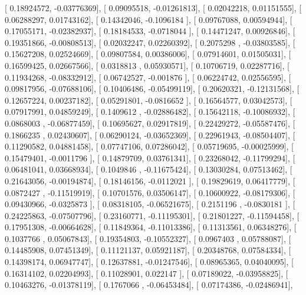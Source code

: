 \documentclass{article}
\begin{document}
       [ 0.18924572, -0.03776369],
       [ 0.09095518, -0.01261813],
       [ 0.02042218,  0.01151555],
       [ 0.06288297,  0.01743162],
       [ 0.14342046, -0.1096184 ],
       [ 0.09767088,  0.00594944],
       [ 0.17055171, -0.02382937],
       [ 0.18184533, -0.0718044 ],
       [ 0.14471247,  0.00926846],
       [ 0.19351866, -0.00808513],
       [ 0.02032247,  0.02260392],
       [ 0.2075298 , -0.03803585],
       [ 0.15627208,  0.02524669],
       [ 0.09807584,  0.00386006],
       [ 0.07914601,  0.01505031],
       [ 0.16599425,  0.02667566],
       [ 0.0318813 ,  0.05930571],
       [ 0.10706719,  0.02287716],
       [ 0.11934268, -0.08332912],
       [ 0.06742527, -0.001876  ],
       [ 0.06224742,  0.02556595],
       [ 0.09817956, -0.07688106],
       [ 0.10406486, -0.05499119],
       [ 0.20620321, -0.12131568],
       [ 0.12657224,  0.00237182],
       [ 0.05291801, -0.0816652 ],
       [ 0.16564577,  0.03042573],
       [ 0.07917991,  0.04859249],
       [ 0.1409612 , -0.02886482],
       [ 0.15642118, -0.10086932],
       [ 0.0868003 , -0.06877459],
       [ 0.10695627,  0.02917819],
       [ 0.22429272, -0.05587476],
       [ 0.1866235 ,  0.02430607],
       [ 0.06290124, -0.03652369],
       [ 0.22961943, -0.08504407],
       [ 0.11290582,  0.04881458],
       [ 0.07747106,  0.07286042],
       [ 0.05719695, -0.00025999],
       [ 0.15479401, -0.0011796 ],
       [ 0.14879709,  0.03761341],
       [ 0.23268042, -0.11799294],
       [ 0.06481041,  0.03668934],
       [ 0.1049846 , -0.11675424],
       [ 0.13030284,  0.07513462],
       [ 0.21643056, -0.00194874],
       [ 0.18146156, -0.0112021 ],
       [ 0.19829619,  0.06417779],
       [ 0.0872427 , -0.11519919],
       [ 0.10701576,  0.03506147],
       [ 0.10600922, -0.08179306],
       [ 0.09430966, -0.0325873 ],
       [ 0.08318105, -0.06521675],
       [ 0.2151196 , -0.0830181 ],
       [ 0.24225863, -0.07507796],
       [ 0.23160771, -0.11195301],
       [ 0.21801227, -0.11594458],
       [ 0.17951308, -0.00664628],
       [ 0.11849364, -0.11013386],
       [ 0.11313561,  0.06348276],
       [ 0.1037766 ,  0.05067843],
       [ 0.19354803, -0.10552327],
       [ 0.0967403 ,  0.05788087],
       [ 0.14485908,  0.07451349],
       [ 0.11121137,  0.05921187],
       [ 0.20348768,  0.07584334],
       [ 0.14398174,  0.06947747],
       [ 0.12637881, -0.01247546],
       [ 0.08965365,  0.04040095],
       [ 0.16314102,  0.02204993],
       [ 0.11028901,  0.022147  ],
       [ 0.07189022, -0.03958825],
       [ 0.10463276, -0.01378119],
       [ 0.1767066 , -0.06453484],
       [ 0.07174386, -0.02486941],
\end{document}
